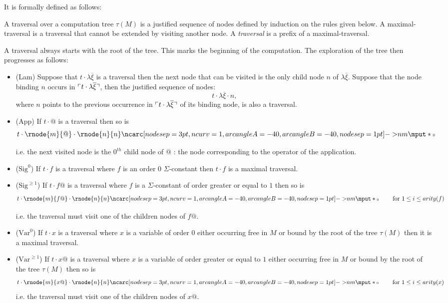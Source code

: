 It is formally defined as follows:

\begin{dfn}[Traversal]
\label{def:traversal} A traversal over a computation tree $\tau(M)$
is a justified sequence of nodes defined by induction on the rules
given below. A maximal-traversal is a traversal that cannot be
extended by visiting another node. A \emph{traversal} is a prefix of
a maximal-traversal.

A traversal always starts with the root of the tree. This marks the
beginning of the computation. The exploration of the tree then
progresses as follows:
\begin{itemize}
\item (Lam) Suppose that $t \cdot \lambda \overline{\xi}$ is a traversal then the next node that can be visited is the only child
node $n$ of $\lambda \overline{\xi}$. Suppose that the node binding
$n$ occurs in $\ulcorner t \cdot \lambda \overline{\xi} \urcorner$, then the
justified sequence of nodes:
$$t \cdot \lambda \overline{\xi} \cdot n,$$
where $n$ points to the previous occurrence in $\ulcorner t \cdot
\lambda \overline{\xi} \urcorner$ of its binding node, is also a traversal.

\item (App) If $t \cdot @$ is a traversal then so is
$$t \cdot \rnode{m}{@} \cdot
\rnode{n}{n} \bkptra[nodesep=1pt]{40}{n}{m} \bklabel{0}$$

i.e. the next visited node is the $0^{th}$ child node of $@$ : the
node corresponding to the operator of the application.


\item ($\mbox{Sig}^0$) If $t \cdot f$ is a traversal where $f$ is an order 0 $\Sigma$-constant then $t \cdot f$ is a maximal traversal.

\item ($\mbox{Sig}^{\geq 1}$) If $t \cdot f@$ is a traversal where $f$ is a $\Sigma$-constant of order greater or equal to
$1$ then so is
$$t \cdot \rnode{m}{f@} \cdot
\rnode{n}{n} \bkptra[nodesep=1pt]{40}{n}{m} \bklabel{0}
\qquad \mbox{ for } 1 \leq i \leq arity(f) $$

i.e. the traversal must visit one of the children nodes of $f@$.

\item ($\mbox{Var}^0$) If $t \cdot x$ is a traversal where $x$ is a variable of order $0$ either occurring free in $M$
or bound by the root of the tree $\tau(M)$ then it is a maximal
traversal.

\item ($\mbox{Var}^{\geq 1}$) If $t \cdot x@$ is a traversal where $x$ is a variable of order greater or equal to $1$ either occurring free in $M$
or bound by the root of the tree $\tau(M)$ then so is
$$t \cdot \rnode{m}{x@} \cdot
\rnode{n}{n} \bkptra[nodesep=1pt]{40}{n}{m} \bklabel{0}
\qquad \mbox{ for } 1 \leq i \leq arity(x) $$
i.e. the
traversal must visit one of the children nodes of $x@$.



\end{itemize}
\end{dfn}
